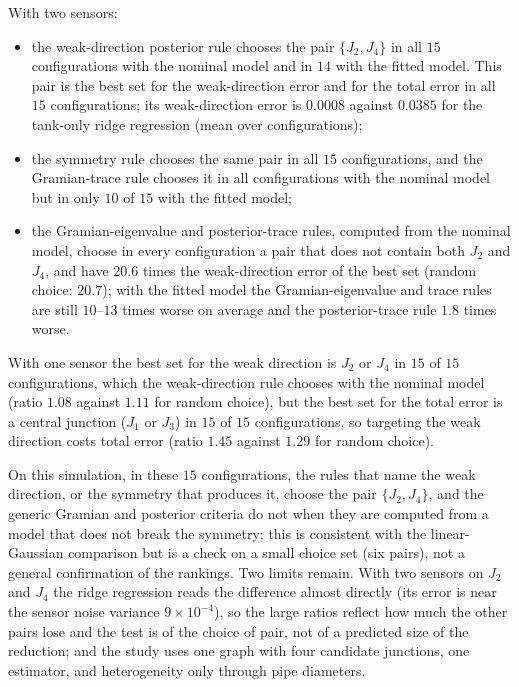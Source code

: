 \documentclass[conference]{IEEEtran}
\begin{document}
With two sensors:
\begin{itemize}
\item the weak-direction posterior rule chooses the pair $\{J_2,J_4\}$ in all $15$ configurations with the nominal model and in $14$ with the fitted model. This pair is the best set for the weak-direction error and for the total error in all $15$ configurations; its weak-direction error is $0.0008$ against $0.0385$ for the tank-only ridge regression (mean over configurations);
\item the symmetry rule chooses the same pair in all $15$ configurations, and the Gramian-trace rule chooses it in all configurations with the nominal model but in only $10$ of $15$ with the fitted model;
\item the Gramian-eigenvalue and posterior-trace rules, computed from the nominal model, choose in every configuration a pair that does not contain both $J_2$ and $J_4$, and have $20.6$ times the weak-direction error of the best set (random choice: $20.7$); with the fitted model the Gramian-eigenvalue and trace rules are still $10$--$13$ times worse on average and the posterior-trace rule $1.8$ times worse.
\end{itemize}
With one sensor the best set for the weak direction is $J_2$ or $J_4$ in $15$ of $15$ configurations, which the weak-direction rule chooses with the nominal model (ratio $1.08$ against $1.11$ for random choice), but the best set for the total error is a central junction ($J_1$ or $J_3$) in $15$ of $15$ configurations, so targeting the weak direction costs total error (ratio $1.45$ against $1.29$ for random choice).

On this simulation, in these $15$ configurations, the rules that name the weak direction, or the symmetry that produces it, choose the pair $\{J_2,J_4\}$, and the generic Gramian and posterior criteria do not when they are computed from a model that does not break the symmetry; this is consistent with the linear-Gaussian comparison but is a check on a small choice set (six pairs), not a general confirmation of the rankings. Two limits remain. With two sensors on $J_2$ and $J_4$ the ridge regression reads the difference almost directly (its error is near the sensor noise variance $9\times10^{-4}$), so the large ratios reflect how much the other pairs lose and the test is of the choice of pair, not of a predicted size of the reduction; and the study uses one graph with four candidate junctions, one estimator, and heterogeneity only through pipe diameters.
\end{document}
